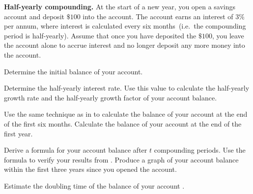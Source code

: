 \documentclass[a4paper,oneside,12pt]{article}
\begin{document}
\begin{example}
\label{eg:savings_6months}
\textbf{Half-yearly compounding.}
At the start of a new year, you open a savings account and deposit
$\$100$ into the account.  The account earns an interest of $3\%$ per
annum, where interest is calculated every six months~(i.e.~the
compounding period is half-yearly).  Assume that once you have
deposited the $\$100$, you leave the account alone to accrue interest
and no longer deposit any more money into the account.
\begin{packedenum}
\item\label{subeg:savings_6months_initial_balance}
  Determine the initial balance of your account.

\item\label{subeg:savings_6months_growth_rate}
  Determine the half-yearly interest rate.  Use this value to
  calculate the half-yearly growth rate and the half-yearly growth
  factor of your account balance.

\item\label{subeg:savings_6months_balance_first_year}
  Use the same technique as in
   to calculate
  the balance of your account at the end of the first six months.
  Calculate the balance of your account at the end of the first year.

\item\label{subeg:savings_6months_balance_formula}
  Derive a formula for your account balance after $t$ compounding
  periods.  Use the formula to verify your results
  from .  Produce a
  graph of your account balance within the first three years since you
  opened the account.

\item\label{subeg:savings_6months_doubling_time}
  Estimate the doubling time of the balance of your account .
\end{packedenum}
\end{example}
\end{document}
